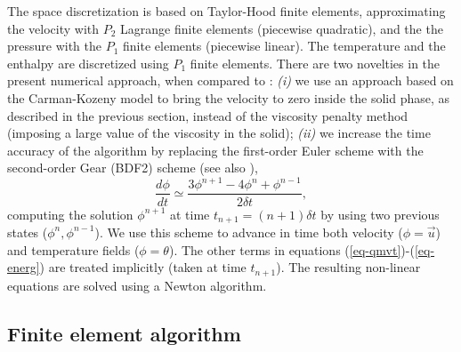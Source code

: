 The space discretization is based on Taylor-Hood finite elements, approximating  the velocity with $P_{2}$ Lagrange finite elements (piecewise quadratic), and the
the pressure with the $P_{1}$ finite elements (piecewise linear). The temperature and the enthalpy are discretized using $P_1$ finite elements.  
There are two novelties in the present numerical approach, when compared to  \cite{dan-2014-JCP}: 
{\em (i)} we use an approach based on the Carman-Kozeny model to bring the velocity to zero inside the solid phase, as described in the previous section, instead of the  viscosity penalty method (imposing a large value of the viscosity in the solid);
{\em (ii)} we increase  the time accuracy of the algorithm by replacing the first-order Euler scheme with the second-order Gear (BDF2) scheme (see also \cite{Belhamadia2012}),
\begin{equation}	
\label{eq-Gear}
	\frac{d\phi}{dt} \simeq \frac{3\phi^{n+1} - 4\phi^{n}+ \phi^{n-1}}{2\delta t},
\end{equation}
computing the solution $\phi^{n+1}$ at time  $t_{n+1}=(n+1) \delta t$ by using two previous states ($\phi^{n}, \phi^{n-1}$). We use this scheme to advance in time both velocity ($\phi=\vec{u}$) and temperature fields  ($\phi=\theta$).  The other terms in equations (\ref{eq-qmvt})-(\ref{eq-energ}) are treated implicitly (\ie taken at time $t_{n+1}$). The resulting non-linear equations are solved using a Newton algorithm. 

\subsection{Finite element algorithm} \label{sec-FE-algo}

